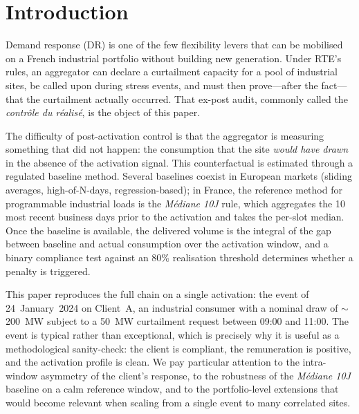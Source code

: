 \documentclass{article}
\begin{document}
\clearpage
\tableofcontents
\clearpage

\twocolumn

\section{Introduction}

Demand response (DR) is one of the few flexibility levers that can be mobilised on a French industrial portfolio without building new generation. Under RTE's rules, an aggregator can declare a curtailment capacity for a pool of industrial sites, be called upon during stress events, and must then prove---after the fact---that the curtailment actually occurred. That ex-post audit, commonly called the \textit{contr\^ole du r\'ealis\'e}, is the object of this paper.

The difficulty of post-activation control is that the aggregator is measuring something that did not happen: the consumption that the site \textit{would have drawn} in the absence of the activation signal. This counterfactual is estimated through a regulated baseline method. Several baselines coexist in European markets (sliding averages, high-of-N-days, regression-based); in France, the reference method for programmable industrial loads is the \textit{M\'ediane 10J} rule, which aggregates the 10 most recent business days prior to the activation and takes the per-slot median. Once the baseline is available, the delivered volume is the integral of the gap between baseline and actual consumption over the activation window, and a binary compliance test against an 80\% realisation threshold determines whether a penalty is triggered.

This paper reproduces the full chain on a single activation: the event of 24~January~2024 on Client~A, an industrial consumer with a nominal draw of $\sim$200~MW subject to a 50~MW curtailment request between 09:00 and 11:00. The event is typical rather than exceptional, which is precisely why it is useful as a methodological sanity-check: the client is compliant, the remuneration is positive, and the activation profile is clean. We pay particular attention to the intra-window asymmetry of the client's response, to the robustness of the \textit{M\'ediane 10J} baseline on a calm reference window, and to the portfolio-level extensions that would become relevant when scaling from a single event to many correlated sites.
\end{document}
